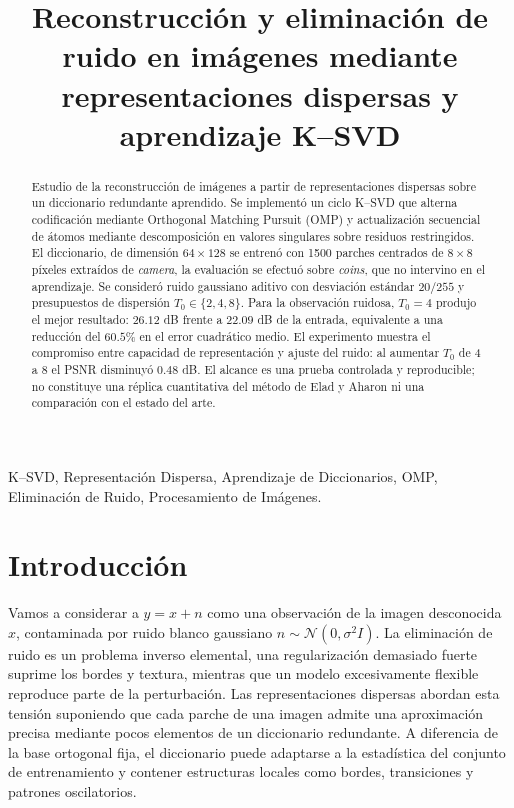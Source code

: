 \documentclass[conference]{IEEEtran}
\title{Reconstrucción y eliminación de ruido en imágenes mediante representaciones dispersas y aprendizaje K--SVD}
\author{\IEEEauthorblockN{S. D. Vásquez Melgarejo, S. J. Arizmendi Rojas, E. A. Rangel Jiménez y J. A. Sánchez Sánchez}
\IEEEauthorblockA{Matemáticas Computacionales\\
Instituto Nacional de Astrofísica, Óptica y Electrónica\\
Puebla, México}}
\begin{document}
\maketitle

\begin{abstract}
Estudio de la reconstrucción de imágenes a partir de representaciones dispersas sobre un diccionario redundante aprendido. Se implementó un ciclo K--SVD que alterna codificación mediante Orthogonal Matching Pursuit (OMP) y actualización secuencial de átomos mediante descomposición en valores singulares sobre residuos restringidos. El diccionario, de dimensión $64\times128$ se entrenó con 1500 parches centrados de $8\times8$ píxeles extraídos de \emph{camera}, la evaluación se efectuó sobre \emph{coins}, que no intervino en el aprendizaje. Se consideró ruido gaussiano aditivo con desviación estándar $20/255$ y presupuestos de dispersión $T_0\in\{2,4,8\}$. Para la observación ruidosa, $T_0=4$ produjo el mejor resultado: $26.12$ dB frente a $22.09$ dB de la entrada, equivalente a una reducción del $60.5\%$ en el error cuadrático medio. El experimento muestra el compromiso entre capacidad de representación y ajuste del ruido: al aumentar $T_0$ de 4 a 8 el PSNR disminuyó $0.48$ dB. El alcance es una prueba controlada y reproducible; no constituye una réplica cuantitativa del método de Elad y Aharon ni una comparación con el estado del arte.
\end{abstract}

\begin{IEEEkeywords}
K--SVD, Representación Dispersa, Aprendizaje de Diccionarios, OMP, Eliminación de Ruido, Procesamiento de Imágenes.
\end{IEEEkeywords}

\section{Introducción}
Vamos a considerar a $y=x+n$ como una observación de la imagen desconocida $x$, contaminada por ruido blanco gaussiano $n\sim\mathcal{N}(0,\sigma^2I)$. La eliminación de ruido es un problema inverso elemental, una regularización demasiado fuerte suprime los bordes y textura, mientras que un modelo excesivamente flexible reproduce parte de la perturbación. Las representaciones dispersas abordan esta tensión suponiendo que cada parche de una imagen admite una aproximación precisa mediante pocos elementos de un diccionario redundante. A diferencia de la base ortogonal fija, el diccionario puede adaptarse a la estadística del conjunto de entrenamiento y contener estructuras locales como bordes, transiciones y patrones oscilatorios.
\end{document}
